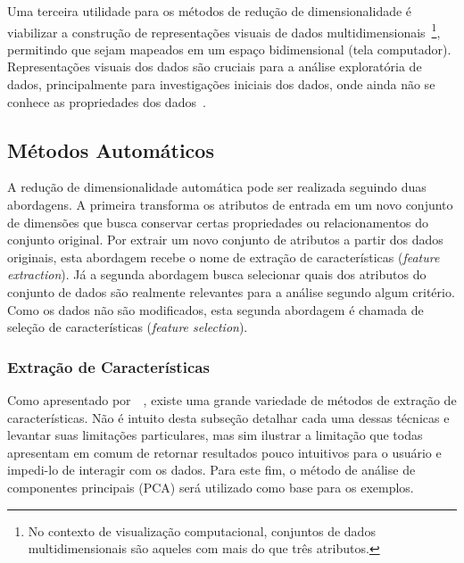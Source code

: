 Uma terceira utilidade para os métodos de redução de dimensionalidade é viabilizar a construção de representações visuais de dados multidimensionais~\footnote{No contexto de visualização computacional, conjuntos de dados multidimensionais são aqueles com mais do que três atributos.}, permitindo que sejam mapeados em um espaço bidimensional (tela computador). Representações visuais dos dados são cruciais para a análise exploratória de dados, principalmente para investigações iniciais dos dados, onde ainda não se conhece as propriedades dos dados~\cite{Kaski2011}. 

\subsection{Métodos Automáticos}

A redução de dimensionalidade automática pode ser realizada seguindo duas abordagens. A primeira transforma os atributos de entrada em um novo conjunto de dimensões que busca conservar certas propriedades ou relacionamentos do conjunto original. Por extrair um novo conjunto de atributos a partir dos dados originais, esta abordagem recebe o nome de extração de características (\emph{feature extraction}). Já a segunda abordagem busca selecionar quais dos atributos do conjunto de dados são realmente relevantes para a análise segundo algum critério. Como os dados não são modificados, esta segunda abordagem é chamada de seleção de características (\emph{feature selection}).

\subsubsection{Extração de Características}

Como apresentado por~\citeauthor{Maaten2009}~\cite{Maaten2009}, existe uma grande variedade de métodos de extração de características. Não é intuito desta subseção detalhar cada uma dessas técnicas e levantar suas limitações particulares, mas sim ilustrar a limitação que todas apresentam em comum de retornar resultados pouco intuitivos para o usuário e impedi-lo de interagir com os dados. Para este fim, o método de análise de componentes principais (PCA) será utilizado como base para os exemplos.



